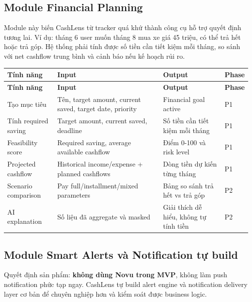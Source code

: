 \documentclass[11pt,a4paper]{article}
\renewcommand{\thead}[1]{\textbf{\color{PrimaryDark}#1}}
\newenvironment{tableblock}{\Needspace{8\baselineskip}\vspace{0.25em}}{\vspace{0.75em}}
\begin{document}
\subsection{Module Financial Planning}
Module này biến CashLens từ tracker quá khứ thành công cụ hỗ trợ quyết định tương lai. Ví dụ: tháng 6 user muốn tháng 8 mua xe giá 45 triệu, có thể trả hết hoặc trả góp. Hệ thống phải tính được số tiền cần tiết kiệm mỗi tháng, so sánh với net cashflow trung bình và cảnh báo nếu kế hoạch rủi ro.

\begin{tableblock}
\scriptsize
\begin{longtable}{L{3.8cm}L{4.3cm}L{4.5cm}L{1.8cm}}
\thead{Tính năng} & \thead{Input} & \thead{Output} & \thead{Phase} \\
\endfirsthead
{}\thead{Tính năng} & \thead{Input} & \thead{Output} & \thead{Phase} \\
\endhead
Tạo mục tiêu & Tên, target amount, current saved, target date, priority & Financial goal active & P1 \\
Tính required saving & Target amount, current saved, deadline & Số tiền cần tiết kiệm mỗi tháng & P1 \\
Feasibility score & Required saving, average available cashflow & Điểm 0-100 và risk level & P1 \\
Projected cashflow & Historical income/expense + planned cashflows & Dòng tiền dự kiến từng tháng & P1 \\
Scenario comparison & Pay full/installment/mixed parameters & Bảng so sánh trả hết vs trả góp & P2 \\
AI explanation & Số liệu đã aggregate và masked & Giải thích dễ hiểu, không tự tính tiền & P2 \\
\end{longtable}
\end{tableblock}

\subsection{Module Smart Alerts và Notification tự build}
Quyết định sản phẩm: \textbf{không dùng Novu trong MVP}, không làm push notification phức tạp ngay. CashLens tự build alert engine và notification delivery layer cơ bản để chuyên nghiệp hơn và kiểm soát được business logic.
\end{document}
